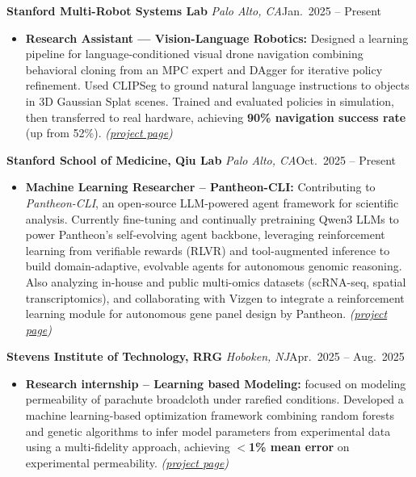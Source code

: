 \documentclass[10pt,letterpaper]{article}
\newcommand{\entry}[3]{%
  \vspace{1pt}\noindent\textbf{#1} \textit{#2}\hfill #3\par}
\begin{document}
\entry{Stanford Multi-Robot Systems Lab}{Palo Alto, CA}{Jan.\ 2025 -- Present}
\begin{itemize}
  \item \textbf{Research Assistant --- Vision-Language Robotics:} Designed a learning pipeline for language-conditioned visual drone navigation combining behavioral cloning from an MPC expert and DAgger for iterative policy refinement. Used CLIPSeg to ground natural language instructions to objects in 3D Gaussian Splat scenes. Trained and evaluated policies in simulation, then transferred to real hardware, achieving \textbf{90\% navigation success rate} (up from 52\%). \textit{(\href{https://rwin2.github.io/erwinpoussi.github.io/project/singer/}{project page})}
\end{itemize}

\entry{Stanford School of Medicine, Qiu Lab}{Palo Alto, CA}{Oct.\ 2025 -- Present}
\begin{itemize}
  \item \textbf{Machine Learning Researcher -- Pantheon-CLI:} Contributing to \textit{Pantheon-CLI}, an open-source LLM-powered agent framework for scientific analysis. Currently fine-tuning and continually pretraining Qwen3 LLMs to power Pantheon's self-evolving agent backbone, leveraging reinforcement learning from verifiable rewards (RLVR) and tool-augmented inference to build domain-adaptive, evolvable agents for autonomous genomic reasoning. Also analyzing in-house and public multi-omics datasets (scRNA-seq, spatial transcriptomics), and collaborating with Vizgen to integrate a reinforcement learning module for autonomous gene panel design by Pantheon. \textit{(\href{https://rwin2.github.io/erwinpoussi.github.io/publication/xu-2026-pantheonos/}{project page})}
\end{itemize}

\entry{Stevens Institute of Technology, RRG}{Hoboken, NJ}{Apr.\ 2025 -- Aug.\ 2025}
\begin{itemize}
  \item \textbf{Research internship -- Learning based Modeling:} focused on modeling permeability of parachute broadcloth under rarefied conditions. Developed a machine learning-based optimization framework combining random forests and genetic algorithms to infer model parameters from experimental data using a multi-fidelity approach, achieving \textbf{$<$1\% mean error} on experimental permeability. \textit{(\href{https://rwin2.github.io/erwinpoussi.github.io/project/parachute-opt/}{project page})}
\end{itemize}
\end{document}

